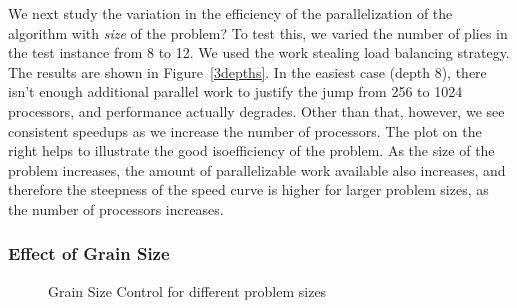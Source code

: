 \documentclass[times, 10pt,twocolumn]{article}
\begin{document}
We next study the variation in the efficiency of the parallelization of the
algorithm with {\em size} of the problem?  To test this, we varied the number of plies in the test instance from
8 to 12. We used the work stealing load balancing strategy.  The results are shown in Figure~\ref{3depths}.   In the easiest case (depth 8), there isn't
enough additional parallel work to justify the jump from 256 to 1024 processors, and performance actually degrades.
Other than that, however, we see consistent speedups as we increase the number of processors.  The plot on the right helps to
illustrate the good isoefficiency of the problem.  As the size of the problem increases, the amount of parallelizable
work available also increases, and therefore the steepness of the speed curve is higher for larger problem sizes, as the
number of processors increases.
 
\subsubsection{Effect of Grain Size}

\begin{figure}[!ht]
\centering
{} 
\vspace{-0.1in}
\caption{Grain Size Control for different problem sizes}
\label{fig:dep}
\vspace{-0.1in}
\end{figure}
\end{document}
